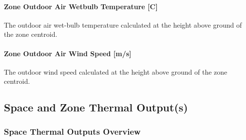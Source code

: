 \paragraph{Zone Outdoor Air Wetbulb Temperature {[}C{]}}\label{zone-outdoor-air-wetbulb-temperature-c-000}

The outdoor air wet-bulb temperature calculated at the height above ground of the zone centroid.

\paragraph{Zone Outdoor Air Wind Speed {[}m/s{]}}\label{zone-outdoor-air-wind-speed-ms-000}

The outdoor wind speed calculated at the height above ground of the zone centroid.

\subsection{Space and Zone Thermal Output(s)}\label{Space-thermal-outputs}

\subsubsection{Space Thermal Outputs Overview}

